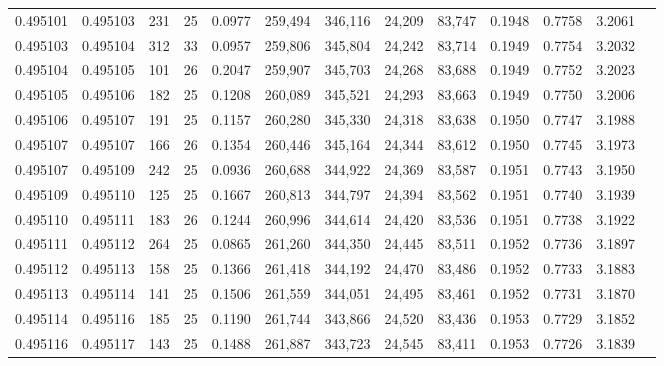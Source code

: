 \begin{tabular}{rrrrrrrrrrrrr}
0.495101 & 0.495103 & 231 &  25 &                                     0.0977 & 259,494 & 346,116 &  24,209 &  83,747 & 0.1948 & 0.7758 & 3.2061 \\
0.495103 & 0.495104 & 312 &  33 &                                     0.0957 & 259,806 & 345,804 &  24,242 &  83,714 & 0.1949 & 0.7754 & 3.2032 \\
0.495104 & 0.495105 & 101 &  26 &                                     0.2047 & 259,907 & 345,703 &  24,268 &  83,688 & 0.1949 & 0.7752 & 3.2023 \\
0.495105 & 0.495106 & 182 &  25 &                                     0.1208 & 260,089 & 345,521 &  24,293 &  83,663 & 0.1949 & 0.7750 & 3.2006 \\
0.495106 & 0.495107 & 191 &  25 &                                     0.1157 & 260,280 & 345,330 &  24,318 &  83,638 & 0.1950 & 0.7747 & 3.1988 \\
0.495107 & 0.495107 & 166 &  26 &                                     0.1354 & 260,446 & 345,164 &  24,344 &  83,612 & 0.1950 & 0.7745 & 3.1973 \\
0.495107 & 0.495109 & 242 &  25 &                                     0.0936 & 260,688 & 344,922 &  24,369 &  83,587 & 0.1951 & 0.7743 & 3.1950 \\
0.495109 & 0.495110 & 125 &  25 &                                     0.1667 & 260,813 & 344,797 &  24,394 &  83,562 & 0.1951 & 0.7740 & 3.1939 \\
0.495110 & 0.495111 & 183 &  26 &                                     0.1244 & 260,996 & 344,614 &  24,420 &  83,536 & 0.1951 & 0.7738 & 3.1922 \\
0.495111 & 0.495112 & 264 &  25 &                                     0.0865 & 261,260 & 344,350 &  24,445 &  83,511 & 0.1952 & 0.7736 & 3.1897 \\
0.495112 & 0.495113 & 158 &  25 &                                     0.1366 & 261,418 & 344,192 &  24,470 &  83,486 & 0.1952 & 0.7733 & 3.1883 \\
0.495113 & 0.495114 & 141 &  25 &                                     0.1506 & 261,559 & 344,051 &  24,495 &  83,461 & 0.1952 & 0.7731 & 3.1870 \\
0.495114 & 0.495116 & 185 &  25 &                                     0.1190 & 261,744 & 343,866 &  24,520 &  83,436 & 0.1953 & 0.7729 & 3.1852 \\
0.495116 & 0.495117 & 143 &  25 &                                     0.1488 & 261,887 & 343,723 &  24,545 &  83,411 & 0.1953 & 0.7726 & 3.1839 \\

\end{tabular}
